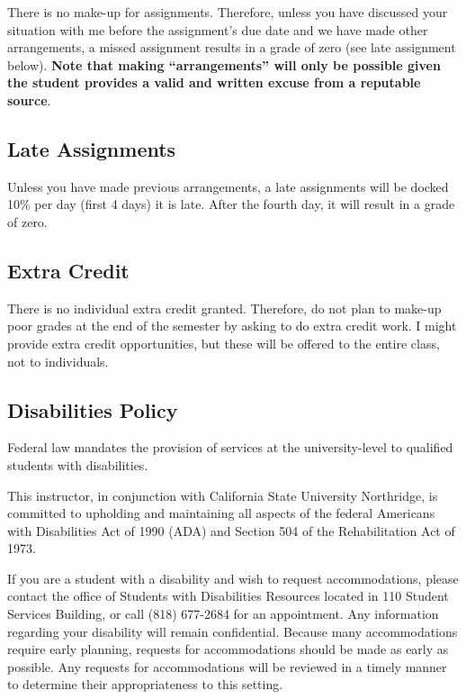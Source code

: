 \documentclass[11pt,]{article}
\begin{document}
There is no make-up for assignments. Therefore, unless you have
discussed your situation with me before the assignment's due date and we
have made other arrangements, a missed assignment results in a grade of
zero (see late assignment below). \textbf{Note that making
``arrangements'' will only be possible given the student provides a
valid and written excuse from a reputable source}.

\hypertarget{late-assignments}{%
\subsection{Late Assignments}\label{late-assignments}}

Unless you have made previous arrangements, a late assignments will be
docked 10\% per day (first 4 days) it is late. After the fourth day, it
will result in a grade of zero.

\hypertarget{extra-credit}{%
\subsection{Extra Credit}\label{extra-credit}}

There is no individual extra credit granted. Therefore, do not plan to
make-up poor grades at the end of the semester by asking to do extra
credit work. I might provide extra credit opportunities, but these will
be offered to the entire class, not to individuals.

\hypertarget{disabilities-policy}{%
\subsection{Disabilities Policy}\label{disabilities-policy}}

Federal law mandates the provision of services at the university-level
to qualified students with disabilities.

This instructor, in conjunction with California State University
Northridge, is committed to upholding and maintaining all aspects of the
federal Americans with Disabilities Act of 1990 (ADA) and Section 504 of
the Rehabilitation Act of 1973.

If you are a student with a disability and wish to request
accommodations, please contact the office of Students with Disabilities
Resources located in 110 Student Services Building, or call (818)
677-2684 for an appointment. Any information regarding your disability
will remain confidential. Because many accommodations require early
planning, requests for accommodations should be made as early as
possible. Any requests for accommodations will be reviewed in a timely
manner to determine their appropriateness to this setting.
\end{document}
